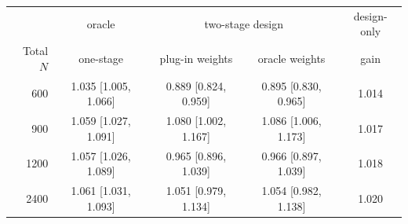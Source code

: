 \begin{tabular}{rcccc}
\toprule
 & oracle & \multicolumn{2}{c}{two-stage design} & design-only \\
Total $N$ & one-stage & plug-in weights & oracle weights & gain \\
\midrule
600 & 1.035 [1.005, 1.066] & 0.889 [0.824, 0.959] & 0.895 [0.830, 0.965] & 1.014 \\
900 & 1.059 [1.027, 1.091] & 1.080 [1.002, 1.167] & 1.086 [1.006, 1.173] & 1.017 \\
1200 & 1.057 [1.026, 1.089] & 0.965 [0.896, 1.039] & 0.966 [0.897, 1.039] & 1.018 \\
2400 & 1.061 [1.031, 1.093] & 1.051 [0.979, 1.134] & 1.054 [0.982, 1.138] & 1.020 \\
\bottomrule
\end{tabular}
